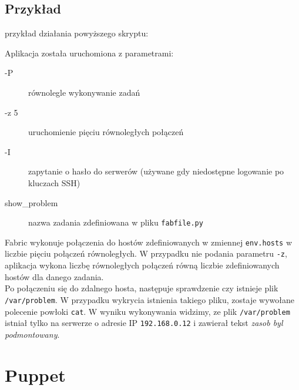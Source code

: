 \subsection{Przykład}

przykład działania powyższego skryptu:

Aplikacja została uruchomiona z parametrami:
\begin{description}
\item[-P] równolegle wykonywanie zadań
\item[-z 5] uruchomienie pięciu równoległych połączeń
\item[-I] zapytanie o hasło do serwerów (używane gdy niedostępne logowanie po kluczach SSH)
\item[show\_problem] nazwa zadania zdefiniowana w pliku \texttt{fabfile.py}
\end{description}
Fabric wykonuje połączenia do hostów zdefiniowanych w zmiennej \texttt{env.hosts} w liczbie pięciu połączeń równoległych.
W przypadku nie podania parametru \texttt{-z}, aplikacja wykona liczbę równoległych połączeń równą liczbie zdefiniowanych hostów dla danego zadania.\\
Po połączeniu się do zdalnego hosta, następuje sprawdzenie czy istnieje plik \texttt{/var/problem}. W przypadku wykrycia istnienia takiego pliku, zostaje wywołane polecenie powłoki \texttt{cat}.
W wyniku wykonywania widzimy, ze plik \texttt{/var/problem} istniał tylko na serwerze o adresie IP \texttt{192.168.0.12} i zawierał tekst \textit{zasob byl podmontowany}.
\section{Puppet}
